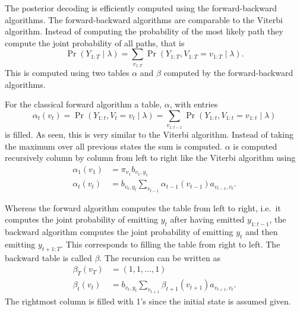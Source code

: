 The posterior decoding is efficiently computed using the forward-backward
algorithms. The forward-backward algorithms are comparable to the Viterbi
algorithm. Instead of computing the probability of the most likely path they
compute the joint probability of all paths, that is
\begin{equation*}
  \Pr
  \left(
    Y_{1:T} \mid \lambda
  \right) = \sum_{v_{1:T}} \Pr
  \left(
    Y_{1:T}, V_{1:T} = v_{1:T} \mid \lambda
  \right).
\end{equation*}
This is computed using two tables $\alpha$ and $\beta$ computed by the
forward-backward algorithms.

For the classical forward algorithm a table, $\alpha$, with entries
\begin{equation*}
\alpha_t(v_t) = \Pr \left( Y_{1:t}, V_t = v_t \mid \lambda \right) =
\sum_{v_{1:t-1}} \Pr \left( Y_{1:t}, V_{1:t} = v_{1:t} \mid \lambda \right)
\end{equation*}
is filled. As seen, this is very similar to the Viterbi algorithm. Instead of
taking the maximum over all previous states the sum is computed. $\alpha$ is
computed recursively column by column from left to right like the Viterbi
algorithm using
\begin{equation}
  \label{eq:8}
  \begin{aligned}
    \alpha_1(v_1) &= \pi_{v_1} b_{v_1, y_1} \\
    \alpha_t(v_t) &= b_{v_t, y_t} \sum_{v_{t - 1}} \alpha_{t - 1}(v_{t - 1})
    a_{v_{t - 1}, v_t}.
  \end{aligned}
\end{equation}

Whereas the forward algorithm computes the table from left to right, i.e.\
it computes the joint probability of emitting $y_t$ after having emitted
$y_{1:t-1}$, the backward algorithm computes the joint probability of emitting
$y_t$ and then emitting $y_{t+1:T}$. This corresponds to filling the table from
right to left. The backward table is called $\beta$. The recursion can be written as
\begin{equation}
  \label{eq:9}
  \begin{aligned}
    \beta_T(v_T) &= (1, 1, \dots, 1) \\
    \beta_t(v_t) &= b_{v_t, y_t} \sum_{v_{t + 1}} \beta_{t + 1}(v_{t + 1})
    a_{v_{t + 1}, v_t}.
  \end{aligned}
\end{equation}
The rightmost column is filled with 1's since the initial state is assumed
given.

